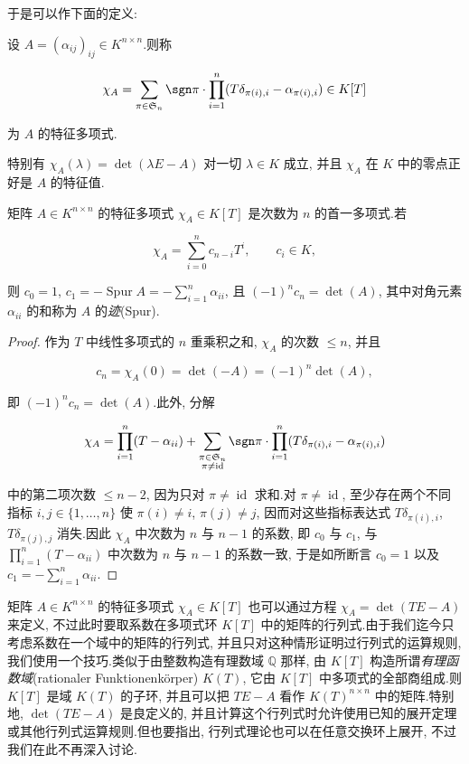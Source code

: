 于是可以作下面的定义:

\begin{definition}[矩阵的特征多项式]\label{def:6.2.2}
设 $A = (\alpha_{ij})_{ij} \in K^{n \times n}$.则称

\[
\chi_A = \sum_{\pi \in \mathfrak{S}_n} \sgn \pi \cdot \prod_{i = 1}^{n} (T \delta_{\pi(i), i} - \alpha_{\pi(i), i}) \in K[T]\]

为 $A$ 的特征多项式.
\end{definition}

特别有 $\chi_A(\lambda) = \det(\lambda E - A)$ 对一切 $\lambda \in K$ 成立, 并且 $\chi_A$ 在 $K$ 中的零点正好是 $A$ 的特征值.

\begin{theorem}\label{thm:6.2.3}
矩阵 $A \in K^{n \times n}$ 的特征多项式 $\chi_A \in K[T]$ 是次数为 $n$ 的首一多项式.若

\[
\chi_A = \sum_{i = 0}^{n} c_{n-i} T^i, \qquad c_i \in K,\]

则 $c_0 = 1$, $c_1 = -\operatorname{Spur} A = -\sum_{i = 1}^{n} \alpha_{ii}$, 且 $(-1)^n c_n = \det(A)$, 其中对角元素 $\alpha_{ii}$ 的和称为 $A$ 的\emph{迹}(\textup{Spur}).
\end{theorem}

\begin{proof}
作为 $T$ 中线性多项式的 $n$ 重乘积之和, $\chi_A$ 的次数 $\leq n$, 并且

\[
c_n = \chi_A(0) = \det(-A) = (-1)^n \det(A),\]

即 $(-1)^n c_n = \det(A)$.此外, 分解

\[
\chi_A = \prod_{i = 1}^{n} (T - \alpha_{ii}) + \sum_{\substack{\pi \in \mathfrak{S}_n \\ \pi \neq \operatorname{id}}} \sgn \pi \cdot \prod_{i = 1}^{n} (T \delta_{\pi(i), i} - \alpha_{\pi(i), i})\]

中的第二项次数 $\leq n - 2$, 因为只对 $\pi \neq \operatorname{id}$ 求和.对 $\pi \neq \operatorname{id}$, 至少存在两个不同指标 $i, j \in \{1, \ldots, n\}$ 使 $\pi(i) \neq i$, $\pi(j) \neq j$, 因而对这些指标表达式 $T \delta_{\pi(i), i}$, $T \delta_{\pi(j), j}$ 消失.因此 $\chi_A$ 中次数为 $n$ 与 $n - 1$ 的系数, 即 $c_0$ 与 $c_1$, 与 $\prod_{i = 1}^{n}(T - \alpha_{ii})$ 中次数为 $n$ 与 $n - 1$ 的系数一致, 于是如所断言 $c_0 = 1$ 以及 $c_1 = -\sum_{i = 1}^{n} \alpha_{ii}$.
\end{proof}

矩阵 $A \in K^{n \times n}$ 的特征多项式 $\chi_A \in K[T]$ 也可以通过方程 $\chi_A = \det(TE - A)$ 来定义, 不过此时要取系数在多项式环 $K[T]$ 中的矩阵的行列式.由于我们迄今只考虑系数在一个域中的矩阵的行列式, 并且只对这种情形证明过行列式的运算规则, 我们使用一个技巧.类似于由整数构造有理数域 $\mathbb{Q}$ 那样, 由 $K[T]$ 构造所谓\emph{有理函数域}(\textup{rationaler Funktionenkörper}) $K(T)$, 它由 $K[T]$ 中多项式的全部商组成.则 $K[T]$ 是域 $K(T)$ 的子环, 并且可以把 $TE - A$ 看作 $K(T)^{n \times n}$ 中的矩阵.特别地, $\det(TE - A)$ 是良定义的, 并且计算这个行列式时允许使用已知的展开定理或其他行列式运算规则.但也要指出, 行列式理论也可以在任意交换环上展开, 不过我们在此不再深入讨论.

